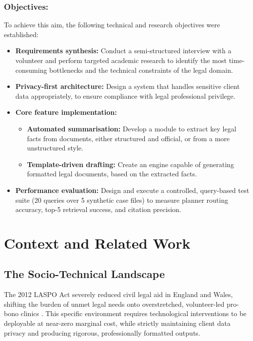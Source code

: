 \documentclass[11pt,a4paper]{article}
\begin{document}
\subsubsection{Objectives:}
To achieve this aim, the following technical and research objectives were established:
\begin{itemize}
    \item \textbf{Requirements synthesis:} Conduct a semi-structured interview with a volunteer and perform targeted academic research to identify the most time-consuming bottlenecks and the technical constraints of the legal domain.
    \item \textbf{Privacy-first architecture:} Design a system that handles sensitive client data appropriately, to ensure compliance with legal professional privilege.
    \item \textbf{Core feature implementation:} \begin{itemize}
        \item \textbf{Automated summarisation:} Develop a module to extract key legal facts from documents, either structured and official, or from a more unstructured style.
        \item \textbf{Template-driven drafting:} Create an engine capable of generating formatted legal documents, based on the extracted facts.
    \end{itemize}
    \item \textbf{Performance evaluation:} Design and execute a controlled, query-based test suite (20 queries over 5 synthetic case files) to measure planner routing accuracy, top-5 retrieval success, and citation precision.
\end{itemize}


\section{Context and Related Work}
\label{sec:context}

\subsection{The Socio-Technical Landscape}

The 2012 LASPO Act severely reduced civil legal aid in England and Wales, shifting the burden of unmet legal needs onto overstretched, volunteer-led pro-bono clinics \cite{laspo2012,moj_laspo_pir2019,laa2023}. This specific environment requires technological interventions to be deployable at near-zero marginal cost, while strictly maintaining client data privacy and producing rigorous, professionally formatted outputs.
\end{document}
